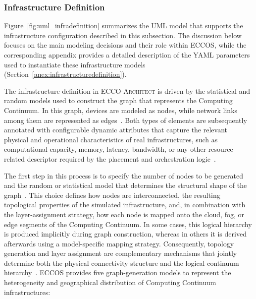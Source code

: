 \documentclass[ASNA]{USG} %
\begin{document}
\subsubsection{Infrastructure Definition}



Figure~\ref{fig:uml_infradefinition} summarizes the UML model that supports the infrastructure configuration described in this subsection. The discussion below focuses on the main modeling decisions and their role within \textsc{ECCOS}, while the corresponding appendix provides a detailed description of the YAML parameters used to instantiate these infrastructure models (Section~\ref{anex:infrastructuredefinition}).


The infrastructure definition in \textsc{ECCO-Architect} is driven by the statistical and random models used to construct the graph that represents the Computing Continuum. In this graph, devices are modeled as nodes, while network links among them are represented as edges~\cite{Norman2011Connectivity}. Both types of elements are subsequently annotated with configurable dynamic attributes that capture the relevant physical and operational characteristics of real infrastructures, such as computational capacity, memory, latency, bandwidth, or any other resource-related descriptor required by the placement and orchestration logic~\cite{Couto2015Reliability}.

The first step in this process is to specify the number of nodes to be generated and the random or statistical model that determines the structural shape of the graph~\cite{Bu2024Edge}. This choice defines how nodes are interconnected, the resulting topological properties of the simulated infrastructure, and, in combination with the layer-assignment strategy, how each node is mapped onto the cloud, fog, or edge segments of the Computing Continuum. In some cases, this logical hierarchy is produced implicitly during graph construction, whereas in others it is derived afterwards using a model-specific mapping strategy. Consequently, topology generation and layer assignment are complementary mechanisms that jointly determine both the physical connectivity structure and the logical continuum hierarchy~\cite{Armeniakos2025Stochastic}. \textsc{ECCOS} provides five graph-generation models to represent the heterogeneity and geographical distribution of Computing Continuum infrastructures:
\end{document}
